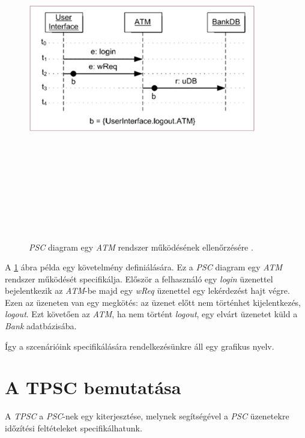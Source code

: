 \begin{figure}[!ht]
    \centering
    \includegraphics[width=100mm, height=15cm, keepaspectratio]{figures/3abra.png}
    \caption{\textit{PSC} diagram egy \textit{ATM} rendszer működésének ellenőrzésére \cite{PSC1}.}
    \label{psc_példa}
\end{figure}
A \ref{psc_példa} ábra példa egy követelmény definiálására.
Ez a \textit{PSC} diagram egy \textit{ATM} rendszer működését specifikálja.
Először a felhasználó egy \textit{login} üzenettel bejelentkezik az \textit{ATM}-be majd egy \textit{wReq} üzenettel egy lekérdezést hajt végre.
Ezen az üzeneten van egy megkötés: az üzenet előtt nem történhet kijelentkezés, \textit{logout}.
Ezt követően az \textit{ATM}, ha nem történt \textit{logout}, egy elvárt üzenetet küld a \textit{Bank} adatbázisába.

Így a szcenárióink specifikálására rendelkezésünkre áll egy grafikus nyelv.

\section{A TPSC bemutatása}
A \textit{TPSC} \cite{TPSC1} a \textit{PSC}-nek egy kiterjesztése, melynek segítségével a \textit{PSC} üzenetekre időzítési feltételeket specifikálhatunk.

